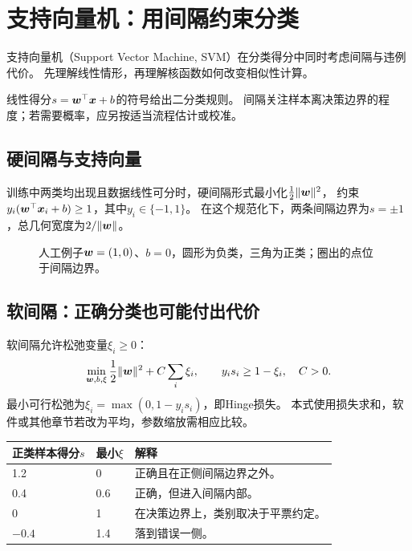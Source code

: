 \chapter{支持向量机：用间隔约束分类}
\label{ch:svm}

支持向量机（Support Vector Machine, SVM）在分类得分中同时考虑间隔与违例代价。
先理解线性情形，再理解核函数如何改变相似性计算。

\begin{keyidea}[得分、间隔与决策]
线性得分$s=\boldsymbol{w}^\top\boldsymbol{x}+b$的符号给出二分类规则。
间隔关注样本离决策边界的程度；若需要概率，应另按适当流程估计或校准。
\end{keyidea}

\section{硬间隔与支持向量}
\label{sec:svm-margin}
训练中两类均出现且数据线性可分时，硬间隔形式最小化$\frac12\lVert\boldsymbol{w}\rVert^2$，
约束$y_i(\boldsymbol{w}^\top\boldsymbol{x}_i+b)\geq1$，其中$y_i\in\{-1,1\}$。
在这个规范化下，两条间隔边界为$s=\pm1$，总几何宽度为$2/\lVert\boldsymbol{w}\rVert$。

\begin{figure}[htbp]
\centering
\caption{人工例子$\boldsymbol{w}=(1,0)$、$b=0$，圆形为负类，三角为正类；圈出的点位于间隔边界。}
\par\smallskip
{}
\end{figure}


\section{软间隔：正确分类也可能付出代价}
\label{sec:svm-soft}
软间隔允许松弛变量$\xi_i\geq0$：
\[
 \min_{\boldsymbol{w},b,\xi}\frac12\lVert\boldsymbol{w}\rVert^2+C\sum_i\xi_i,
 \qquad y_is_i\geq1-\xi_i,\quad C>0.
\]
最小可行松弛为$\xi_i=\max(0,1-y_is_i)$，即Hinge损失。
本式使用损失求和，软件或其他章节若改为平均，参数缩放需相应比较。

\begin{center}
\begin{tabularx}{\textwidth}{P{27mm}P{24mm}Y}
\toprule
正类样本得分$s$ & 最小$\xi$ & 解释\\
 & 0 & 正确且在正侧间隔边界之外。\\
0.4 & 0.6 & 正确，但进入间隔内部。\\
0 & 1 & 在决策边界上，类别取决于平票约定。\\
$-0.4$ & 1.4 & 落到错误一侧。\\
\bottomrule
\end{tabularx}
\end{center}

